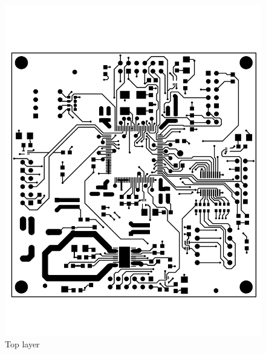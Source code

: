 \begin{appendices}
\begin{figure}[ptb]
	\begin{centering}
		\includegraphics[width=6in]{Appendices/Figures/appendices-layout_top.pdf}
		\caption{Top layer}
		\label{fig:appendices:layout_top}
	\end{centering}
\end{figure}


\end{appendices}
